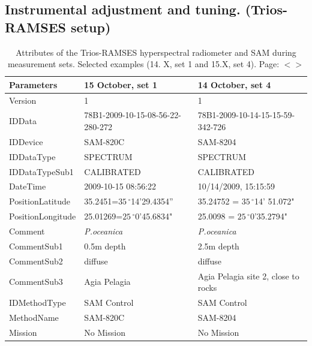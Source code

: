 \documentclass[11pt]{article}
\begin{document}
\begin{appendices}
\pagebreak

\subsection[Instrumental adjustment and tuning]{Instrumental adjustment and tuning. (Trios-RAMSES setup)}

\begin{table}[H]\footnotesize
	\caption{Attributes of the Trios-RAMSES hyperspectral radiometer and \ac{SAM} during measurement sets. Selected examples (14. X, set 1 and 15.X, set 4). Page: $<$\pageref{page-30}$>$}\label{tab:A.1}
	\centering
	  \begin{tabular}{| p{3cm} | p{3cm} | p{5cm} |}
		\hline
		    \textbf{Parameters} & \textbf{15 October, set 1} & \textbf{14 October, set 4} \\ \hline \hline
		     Version &1 & 1 \\ \hline
		     IDData & 78B1-2009-10-15-08-56-22-280-272 & 78B1-2009-10-14-15-15-59-342-726 \\ \hline
		     IDDevice & SAM-820C & SAM-8204\\ \hline
		     IDDataType & SPECTRUM & SPECTRUM \\ \hline
		     IDDataTypeSub1 & CALIBRATED & CALIBRATED \\ \hline
		     DateTime & 2009-10-15 08:56:22 & 10/14/2009, 15:15:59 \\ \hline
		     PositionLatitude & 35.2451=$35\,^{\circ}$14'29.4354” & 35.24752 = $35\,^{\circ}$14' 51.072" \\ \hline
		     PositionLongitude & 25.01269=$25\,^{\circ}$0'45.6834" & 25.0098 = $25\,^{\circ}$0'35.2794" \\ \hline
		     Comment & \textit{P.oceanica} & \textit{P.oceanica} \\ \hline
		     CommentSub1 & 0.5m depth & 2.5m depth \\ \hline
		     CommentSub2 & diffuse & diffuse \\ \hline
		     CommentSub3 & Agia Pelagia & Agia Pelagia site 2, close to rocks \\ \hline
		     IDMethodType & SAM Control & SAM Control \\ \hline
		    MethodName & SAM-820C & SAM-8204 \\ \hline
		    Mission & No Mission & No Mission \\ \hline

\end{tabular}
\end{table}
\end{appendices}
\end{document}

